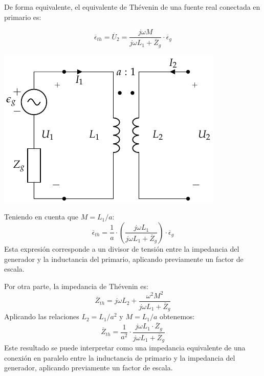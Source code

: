 De forma equivalente, el equivalente de Thévenin de una fuente real conectada en primario es:

\[
  \overline{\epsilon}_{th} = \overline{U}_2 = \frac{j\omega M}{j\omega L_1 + \overline{Z}_g} \cdot \overline{\epsilon}_g
\]

\begin{center}
\includegraphics[height=0.2\textheight]{../figs/Trafo_Perfecto_FuentePrimario.pdf}
\end{center}

Teniendo en cuenta que $M = L_1/a$:
\[
  \overline{\epsilon}_{th} = \frac{1}{a} \cdot \left(\frac{j\omega L_1}{j\omega L_1 + \overline{Z}_g}\right) \cdot \overline{\epsilon}_g
\]
Esta expresión corresponde a un divisor de tensión entre la impedancia del generador y la inductancia del primario, aplicando previamente un factor de escala.

Por otra parte, la impedancia de Thévenin es:
\[
  \overline{Z}_{th} = j\omega L_2 + \frac{\omega^2 M^2}{j\omega L_1 + \overline{Z}_g}
\]
Aplicando las relaciones $L_2 = L_1/a^2$ y $M = L_1/a$ obtenemos:
\begin{equation}
  \label{eq:trafo-perfecto-impedancia-thevenin}
  \overline{Z}_{th} = \frac{1}{a^2} \cdot \frac{j \omega L_1 \cdot \overline{Z}_g}{j\omega L_1 + \overline{Z}_g}
\end{equation}
Este resultado se puede interpretar como una impedancia equivalente de una conexión en paralelo entre la inductancia de primario y la impedancia del generador, aplicando previamente un factor de escala.




